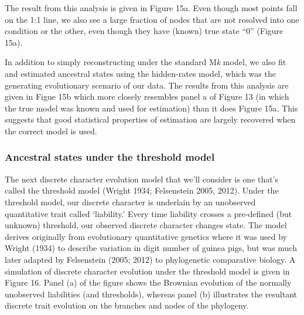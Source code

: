 \documentclass{article}
\begin{document}
The result from this analysis is given in Figure 15a. Even though most points fall on the 1:1 line, we also see a large fraction of nodes that are not resolved into one condition or the other, even though they have (known) true state ``0'' (Figure 15a).

In addition to simply reconstructing under the standard M\emph{k} model, we also fit and estimated ancestral states using the hidden-rates model, which was the generating evolutionary scenario of our data. The results from this analysis are given in Figue 15b which more closely resembles panel a of Figure 13 (in which the true model was known and used for estimation) than it does Figure 15a. This suggests that good statistical properties of estimation are largely recovered when the correct model is used.

\subsubsection{Ancestral states under the threshold model}\label{ancestral-states-under-the-threshold-model}

The next discrete character evolution model that we'll consider is one that's called the threshold model (Wright 1934; Felsenstein 2005, 2012). Under the threshold model, our discrete character is underlain by an unobserved quantitative trait called `liability.' Every time liability crosses a pre-defined (but unknown) threshold, our observed discrete character changes state. The model derives originally from evolutionary quantitative genetics where it was used by Wright (1934) to describe variation in digit number of guinea pigs, but was much later adapted by Felsenstein (2005; 2012) to phylogenetic comparative biology. A simulation of discrete character evolution under the threshold model is given in Figure 16. Panel (a) of the figure shows the Brownian evolution of the normally unobserved liabilities (and thresholds), whereas panel (b) illustrates the resultant discrete trait evolution on the branches and nodes of the phylogeny.
\end{document}
